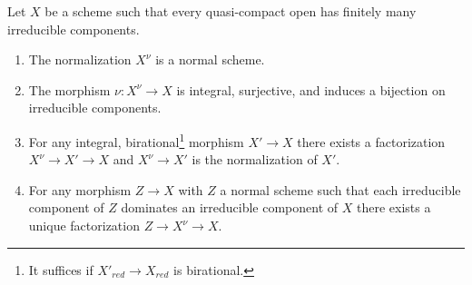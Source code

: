 \begin{lemma}
\label{lemma-normalization-normal}
Let $X$ be a scheme such that every quasi-compact open has
finitely many irreducible components.
\begin{enumerate}
\item The normalization $X^\nu$ is a normal scheme.
\item The morphism $\nu : X^\nu \to X$ is integral, surjective, and
induces a bijection on irreducible components.
\item For any integral, birational\footnote{It suffices if
$X'_{red} \to X_{red}$ is birational.} morphism $X' \to X$ there
exists a factorization $X^\nu \to X' \to X$ and $X^\nu \to X'$
is the normalization of $X'$.
\item For any morphism $Z \to X$ with $Z$ a normal scheme
such that each irreducible component of $Z$ dominates an irreducible
component of $X$ there exists a unique factorization $Z \to X^\nu \to X$.
\end{enumerate}
\end{lemma}

